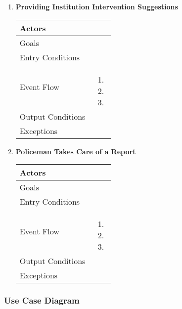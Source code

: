 \begin{enumerate}
	\item \textbf{Providing Institution Intervention Suggestions}
		\begin{table}[h!]
		\begin{tabular}{|l|p{}|}
		\hline
		Actors            			&       	\\ \hline
		Goals             			&         	\\ \hline
		Entry Conditions  	&  		\\ \hline
		Event Flow        		&          
				\begin{enumerate}[label=\alph*)]
					\item
					\item
					\item
					\end{enumerate}\\ \hline
		Output Conditions &    		\\ \hline
		Exceptions        		&       	\\ \hline
	\end{tabular}
	\end{table}
	
	\clearpage
	
	\item \textbf{Policeman Takes Care of a Report}
		\begin{table}[h!]
		\begin{tabular}{|l|p{}|}
		\hline
		Actors            			&       	\\ \hline
		Goals             			&         	\\ \hline
		Entry Conditions  	&  		\\ \hline
		Event Flow        		&          
				\begin{enumerate}[label=(\alph*)]
					\item
					\item
					\item
					\end{enumerate}\\ \hline
		Output Conditions &    		\\ \hline
		Exceptions        		&       	\\ \hline
	\end{tabular}
	\end{table}
	
	
	
	
	\end{enumerate}
	
	\subsubsection{Use Case Diagram}
	
